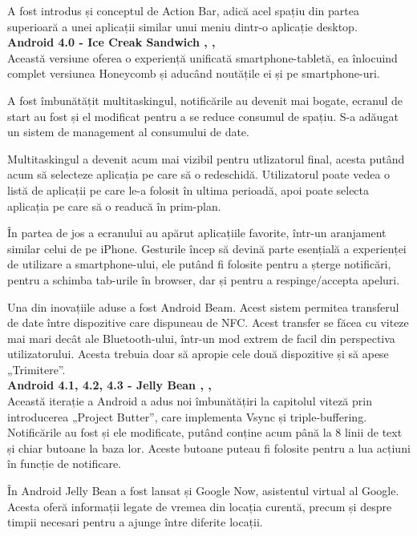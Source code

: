 \documentclass[12pt, a4paper, oneside]{article}
\begin{document}
	A fost introdus și conceptul de Action Bar, adică acel spațiu din partea superioară a unei aplicații similar unui meniu dintr-o aplicație desktop.\\

\textbf{Android 4.0 - Ice Creak Sandwich \cite{AndroidVersionsHistory}, \cite{AndroidHistory}, \cite{DeveloperAndroid}}\\
Această versiune oferea o experiență unificată smartphone-tabletă, ea înlocuind complet versiunea Honeycomb și aducând noutățile ei și pe smartphone-uri.

	A fost îmbunătățit multitaskingul, notificările au devenit mai bogate, ecranul de start au fost și el modificat pentru a se reduce consumul de spațiu. S-a adăugat un sistem de management al consumului de date.

	Multitaskingul a devenit acum mai vizibil pentru utlizatorul final, acesta putând acum să selecteze aplicația pe care să o redeschidă. Utilizatorul poate vedea o listă de aplicații pe care le-a folosit în ultima perioadă, apoi poate selecta aplicația pe care să o readucă în prim-plan.

	În partea de jos a ecranului au apărut aplicațiile favorite, într-un aranjament similar celui de pe iPhone. Gesturile încep să devină parte esențială a experienței de utilizare a smartphone-ului, ele putând fi folosite pentru a șterge notificări, pentru a schimba tab-urile în browser, dar și pentru a respinge/accepta apeluri.

	Una din inovațiile aduse a fost Android Beam. Acest sistem permitea transferul de date între dispozitive care dispuneau de NFC. Acest transfer se făcea cu viteze mai mari decât ale Bluetooth-ului, într-un mod extrem de facil din perspectiva utilizatorului. Acesta trebuia doar să apropie cele două dispozitive și să apese „Trimitere”.\\

\textbf{Android 4.1, 4.2, 4.3 - Jelly Bean \cite{AndroidVersionsHistory}, \cite{AndroidHistory}, \cite{DeveloperAndroid}}\\
Această iterație a Android a adus noi îmbunătățiri la capitolul viteză prin introducerea „Project Butter”, care implementa Vsync și triple-buffering. Notificările au fost și ele modificate, putând conține acum până la 8 linii de text și chiar butoane la baza lor. Aceste butoane puteau fi folosite pentru a lua acțiuni în funcție de notificare.

	În Android Jelly Bean a fost lansat și Google Now, asistentul virtual al Google. Acesta oferă informații legate de vremea din locația curentă, precum și despre timpii necesari pentru a ajunge între diferite locații.
\end{document}
